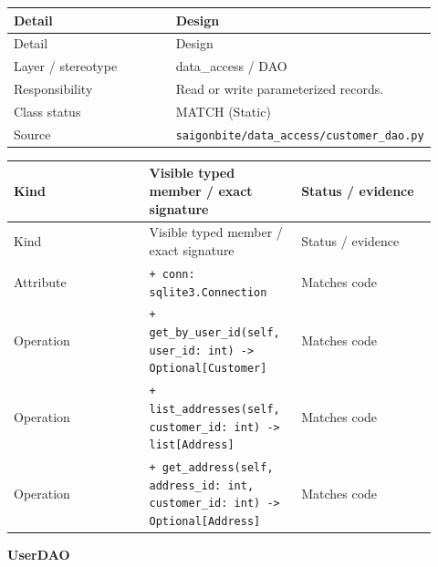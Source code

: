 \begin{longtable}{>{\raggedright\arraybackslash}p{0.4600\linewidth}>{\raggedright\arraybackslash}p{0.4600\linewidth}}
Detail & Design \\
\hline\endfirsthead
Detail & Design \\
\hline\endhead
Layer / stereotype & data\_access / \guillemotleft{}DAO\guillemotright{} \\
Responsibility & Read or write parameterized records. \\
Class status & MATCH (Static) \\
Source & \texttt{saigonbite/\allowbreak{}data\_\allowbreak{}access/\allowbreak{}customer\_\allowbreak{}dao.\allowbreak{}py} \\
\end{longtable}
\begin{longtable}{>{\raggedright\arraybackslash}p{0.3067\linewidth}>{\raggedright\arraybackslash}p{0.3067\linewidth}>{\raggedright\arraybackslash}p{0.3067\linewidth}}
Kind & Visible typed member / exact signature & Status / evidence \\
\hline\endfirsthead
Kind & Visible typed member / exact signature & Status / evidence \\
\hline\endhead
Attribute & \texttt{+ conn: sqlite3.\allowbreak{}Connection} & Matches code \\
Operation & \texttt{+ get\_\allowbreak{}by\_\allowbreak{}user\_\allowbreak{}id(self, user\_\allowbreak{}id: int) -\textgreater{} Optional[Customer]} & Matches code \\
Operation & \texttt{+ list\_\allowbreak{}addresses(self, customer\_\allowbreak{}id: int) -\textgreater{} list[Address]} & Matches code \\
Operation & \texttt{+ get\_\allowbreak{}address(self, address\_\allowbreak{}id: int, customer\_\allowbreak{}id: int) -\textgreater{} Optional[Address]} & Matches code \\
\end{longtable}
\textbf{UserDAO}

